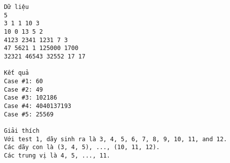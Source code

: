 \begin{verbatim}
Dữ liệu
5
3 1 1 10 3
10 0 13 5 2
4123 2341 1231 7 3
47 5621 1 125000 1700
32321 46543 32552 17 17

Kết quả
Case #1: 60
Case #2: 49
Case #3: 102186
Case #4: 4040137193
Case #5: 25569

Giải thích
Với test 1, dãy sinh ra là 3, 4, 5, 6, 7, 8, 9, 10, 11, and 12.
Các dãy con là (3, 4, 5), ..., (10, 11, 12).
Các trung vị là 4, 5, ..., 11.
\end{verbatim}